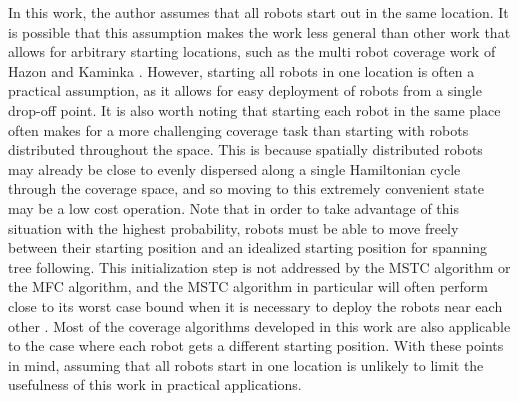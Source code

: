 In this work, the author assumes that all robots start out in the same location. It is possible that this assumption makes the work less general than other work that allows for arbitrary starting locations, such as the multi robot coverage work of Hazon and Kaminka \cite{Hazon}. However, starting all robots in one location is often a practical assumption, as it allows for easy deployment of robots from a single drop-off point. It is also worth noting that starting each robot in the same place often makes for a more challenging coverage task than starting with robots distributed throughout the space. This is because spatially distributed robots may already be close to evenly dispersed along a single Hamiltonian cycle through the coverage space, and so moving to this extremely convenient state may be a low cost operation. Note that in order to take advantage of this situation with the highest probability, robots must be able to move freely between their starting position and an idealized starting position for spanning tree following. This initialization step is not addressed by the MSTC algorithm or the MFC algorithm, and the MSTC algorithm in particular will often perform close to its worst case bound when it is necessary to deploy the robots near each other \cite{Zheng}\cite{Hazon}. Most of the coverage algorithms developed in this work are also applicable to the case where each robot gets a different starting position. With these points in mind, assuming that all robots start in one location is unlikely to limit the usefulness of this work in practical applications.

